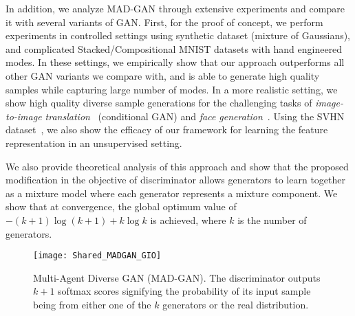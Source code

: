 In addition, we analyze MAD-GAN through extensive experiments and compare it with several variants of GAN. First, for the proof of concept, we perform experiments in controlled settings using synthetic dataset (mixture of Gaussians), and complicated Stacked/Compositional MNIST datasets with hand engineered modes. In these settings, we empirically show that our approach outperforms all other GAN variants we compare with, and is able to generate high quality samples while capturing large number of modes. In a more realistic setting, we show high quality diverse sample generations for the challenging tasks of {\em image-to-image translation}~\cite{isola2016image2image} (conditional GAN) and {\em face generation}~\cite{chen2016infogan,radford2015unsupervised}. Using the SVHN dataset~\cite{Netzer11SVHN}, we also show the efficacy of our framework for learning the feature representation in an unsupervised setting.

We also provide theoretical analysis of this approach and show that the proposed modification in the objective of discriminator allows generators to learn together as a mixture model where each generator represents a mixture component. We show that at convergence, the global optimum value of $-(k+1)\log(k+1) + k \log k$ is achieved, where $k$ is the number of generators. 

\begin{figure}[ht]
	\centering
	\texttt{[image: Shared\_MADGAN\_GIO]}
	\caption{Multi-Agent Diverse GAN (MAD-GAN). The discriminator outputs $k+1$ softmax scores signifying the probability of its input sample being from either one of the $k$ generators or the real distribution. 
	}
	\label{fig:multiAgentGAN}
	\vspace{-4mm}
\end{figure}
